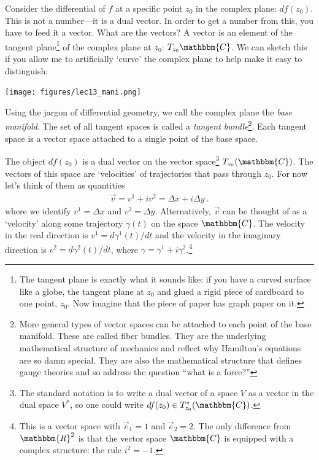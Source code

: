 Consider the differential of $f$ at a specific point $z_0$ in the complex plane: $df(z_0)$. This is not a number---it is a dual vector. In order to get a number from this, you have to feed it a vector. What are the vectors? A vector is an element of the tangent plane\footnote{The tangent plane is exactly what it sounds like: if you have a curved surface like a globe, the tangent plane at $z_0$ and glued a rigid piece of cardboard to one point, $z_0$. Now imagine that the piece of paper has graph paper on it.} of the complex plane at $z_0$: $T_{z_0}\mathbbm{C}$. We can sketch this if you allow me to artificially `curve' the complex plane to help make it easy to distinguish:
\begin{center}
\texttt{[image: figures/lec13\_mani.png]}
\end{center}
Using the jargon of differential geometry, we call the complex plane the \emph{base manifold}. The set of all tangent spaces is called a \emph{tangent bundle}\footnote{More general types of vector spaces can be attached to each point of the base manifold. These are called fiber bundles. They are the underlying mathematical structure of mechanics and reflect why Hamilton's equations are so damn special. They are also the mathematical structure that defines gauge theories and so address the question ``what is a force?''}. Each tangent space is a vector space attached to a single point of the base space. 

The object $df(z_0)$ is a dual vector on the vector space\footnote{The standard notation is to write a dual vector of a space $V$ as a vector in the dual space $V^*$, so one could write $df(z_0) \in T^*_{z_0}(\mathbbm{C})$.} $T_{z_0}(\mathbbm{C})$.  The vectors of this space are `velocities' of trajectories that pass through $z_0$. For now let's think of them as quantities
\begin{align}
	\vec v = v^1 + i v^2 = \Delta x + i \Delta y \ .
\end{align}
where we identify $v^1 = \Delta x$ and $v^2 = \Delta y$. Alternatively, $\vec{v}$ can be thought of as a `velocity' along some trajectory $\gamma(t)$ on the space $\mathbbm{C}$. The velocity in the real direction is $v^1 = d\gamma^1(t)/dt$ and the velocity in the imaginary direction is $v^2 = d\gamma^2(t)/dt$, where $\gamma = \gamma^1 + i \gamma^2$.\footnote{This is a vector space with $\vec{e}_{1} = 1$ and  $\vec{e}_{2} = 2$. The only difference from $\mathbbm{R}^2$ is that the vector space $\mathbbm{C}$ is equipped with a complex structure: the rule $i^2 = -1$.}

